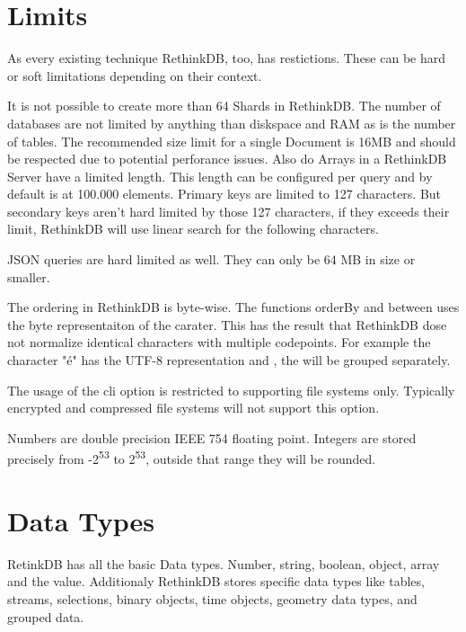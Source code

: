 \section{Limits}

As every existing technique RethinkDB, too, has restictions. 
These can be hard or soft limitations depending on their context.
\cite{RethinkLimits}

It is not possible to create more than 64 Shards in RethinkDB.
The number of databases are not limited by anything than diskspace and RAM as is the number of tables.
The recommended size limit for a single Document is 16MB and should be respected due to potential perforance issues.
Also do Arrays in a RethinkDB Server have a limited length.
This length can be configured per query and by default is at 100.000 elements.
Primary keys are limited to 127 characters.
But secondary keys aren't hard limited by those 127 characters, if they exceeds their limit, RethinkDB will use linear search for the following characters.

JSON queries are hard limited as well.
They can only be 64 MB in size or smaller.

The ordering in RethinkDB is byte-wise.
The functions orderBy and between uses the byte representaiton of the carater.
This has the result that RethinkDB dose not normalize identical characters with multiple codepoints.
For example the character "é" has the UTF-8 representation  and , the will be grouped separately.

The usage of the cli option  is restricted to supporting file systems only.
Typically encrypted and compressed file systems will not support this option.

Numbers are double precision IEEE 754 floating point.
Integers are stored precisely from -2\textsuperscript{53} to 2\textsuperscript{53}, outside that range they will be rounded.

\section{Data Types}

RetinkDB has all the basic Data types. 
Number, string, boolean, object, array and the  value. 
Additionaly RethinkDB stores specific data types like tables, streams, selections, binary objects, time objects, geometry data types, and grouped data.
\cite{RethinkDataTypes}

